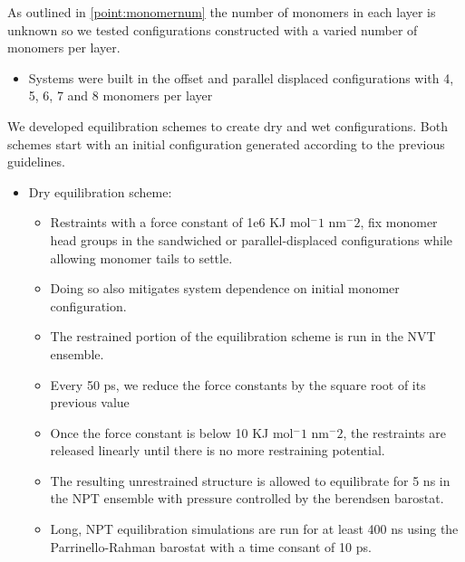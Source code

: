 \documentclass{article}
\begin{document}
  As outlined in \ref{point:monomernum} the number of monomers in each layer is unknown
  so we tested configurations constructed with a varied number of monomers per layer.
  \begin{itemize}
	\item Systems were built in the offset and parallel displaced configurations
        with 4, 5, 6, 7 and 8 monomers per layer
  \end{itemize}


  We developed equilibration schemes to create dry and wet configurations. Both schemes 
  start with an initial configuration generated according to the previous guidelines.
  \begin{itemize}
      \item Dry equilibration scheme:
      \begin{itemize}
          \item Restraints with a force constant of 1e6 KJ mol$^-1$ nm$^-2$, fix monomer 
	  head groups in the sandwiched or parallel-displaced configurations while 
          allowing monomer tails to settle.
          \item Doing so also mitigates system dependence on initial monomer configuration.
          \item The restrained portion of the equilibration scheme is run in the NVT ensemble.
          \item Every 50 ps, we reduce the force constants by the square root of its
          previous value %
          \item Once the force constant is below 10 KJ mol$^-1$ nm$^-2$, the restraints are
          released linearly until there is no more restraining potential.
          \item The resulting unrestrained structure is allowed to equilibrate for 5 ns 
	  in the NPT ensemble with pressure controlled by the berendsen barostat.
	  \item Long, NPT equilibration simulations are run for at least 400 ns using the 
          Parrinello-Rahman barostat with a time consant of 10 ps.
      \end{itemize}

\end{itemize}
\end{document}
